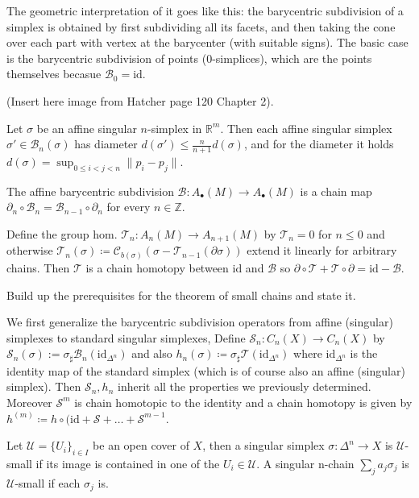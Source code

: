 The geometric interpretation of it goes like this: the barycentric subdivision of a
simplex is obtained by first subdividing all its facets, and then taking the cone over each part
with vertex at the barycenter (with suitable signs). The basic case is the barycentric subdivision
of points (0-simplices), which are the points themselves becasue \( \mathcal{B}_0 = \text{id} \).

(Insert here image from Hatcher page 120 Chapter 2).

Let \( \sigma \) be an affine singular \( n \)-simplex in \( \mathbb{R}^m \). Then each affine singular simplex
\( \sigma' \in \mathcal{B}_n(\sigma) \) has diameter \( d(\sigma') \leq \frac{n}{n+1}d(\sigma) \),
and for the diameter it holds \( d(\sigma) = \sup_{0 \leq i < j < n} \|p_i - p_j\| \).

The affine barycentric subdivision \( \mathcal{B} : A_\bullet(M) \to A_\bullet(M) \) is a chain map
\( \partial_n \circ \mathcal{B}_n = \mathcal{B}_{n-1} \circ \partial_n \) for every \( n \in \mathbb{Z} \).

Define the group hom. \( \mathcal{T}_n : A_n(M) \to A_{n+1}(M) \) by 
\( \mathcal{T}_n = 0 \) for \( n \leq 0 \)
and otherwise \( \mathcal{T}_{n}(\sigma) \coloneqq \mathcal{C}_{b(\sigma)}(\sigma -  \mathcal{T}_{n-1}(\partial \sigma)) \) extend it linearly for arbitrary chains.
Then \( \mathcal{T} \) is a chain homotopy between \( \text{id} \) and \( \mathcal{B} \) so \( \partial \circ \mathcal{T} + \mathcal{T} \circ \partial = \text{id} - \mathcal{B} \).

Build up the prerequisites for the theorem of small chains and state it.

We first generalize the barycentric subdivision operators from affine (singular) simplexes to standard singular simplexes,
Define \( \mathcal{S}_n : C_n(X) \to C_n(X) \) by \( \mathcal{S}_n(\sigma) := \sigma_{\sharp}\mathcal{B}_n(\text{id}_{\Delta^n})\)
and also \( h_n(\sigma) \coloneqq \sigma_{\sharp}\mathcal{T}(\text{id}_{\Delta^n}) \) where \( \text{id}_{\Delta^n} \)
is the identity map of the standard simplex (which is of course also an affine (singular) simplex).
Then \( \mathcal{S}_n, h_n \) inherit all the properties we previously determined.
Moreover \( \mathcal{S}^m \) is chain homotopic to the identity and a chain homotopy is given by
\( h^{(m)} \coloneqq h \circ (\text{id} + \mathcal{S} + \dots + \mathcal{S}^{m-1} \).

Let \( \mathcal{U} = \{U_i\}_{i \in I} \) be an open cover of \( X \), then a singular simplex \( \sigma : \Delta^n \to X \)
is \( \mathcal{U} \)-small if its image is contained in one of the \( U_i \in \mathcal{U} \).
A singular n-chain \( \sum_j a_j \sigma_j \) is \( \mathcal{U} \)-small if each \( \sigma_j \) is.

